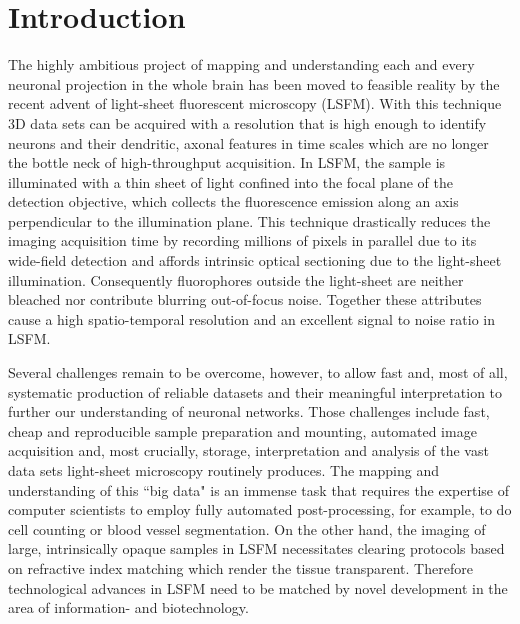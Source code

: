 \documentclass[12pt]{spieman}  %
\begin{document}
\section{Introduction}%
\label{sect:intro}  

The highly ambitious project of mapping and understanding each and every neuronal projection in the whole brain has been moved to feasible reality by the recent advent of light-sheet fluorescent microscopy (LSFM)\cite{Huisken2004,Dodt2007,Keller2012}. With this technique 3D data sets can be acquired with a resolution that is high enough to identify neurons and their dendritic, axonal features in time scales which are no longer the bottle neck of high-throughput acquisition. In LSFM, the sample is illuminated with a thin sheet of light confined into the focal plane of the detection objective, which collects the fluorescence emission along an axis perpendicular to the illumination plane\cite{Huisken2009}. This technique drastically reduces the imaging acquisition time by recording millions of pixels in parallel due to its wide-field detection and affords intrinsic optical sectioning due to the light-sheet illumination. Consequently fluorophores outside the light-sheet are neither bleached nor contribute blurring out-of-focus noise. Together these attributes cause a high spatio-temporal resolution and an excellent signal to noise ratio in LSFM. 

Several challenges remain to be overcome, however, to allow fast and, most of all, systematic production of reliable datasets and their meaningful interpretation to further our understanding of neuronal networks. Those challenges include fast, cheap and reproducible sample preparation and mounting, automated image acquisition and, most crucially, storage, interpretation and analysis of the vast data sets light-sheet microscopy routinely produces. The mapping and understanding of this ``big data" is an immense task that requires the expertise of computer scientists to employ fully automated post-processing, for example, to do cell counting or blood vessel segmentation. On the other hand, the imaging of large, intrinsically opaque samples in LSFM necessitates clearing protocols based on refractive index matching which render the tissue transparent. Therefore technological advances in LSFM need to be matched by novel development in the area of information- and biotechnology.
\end{document}
